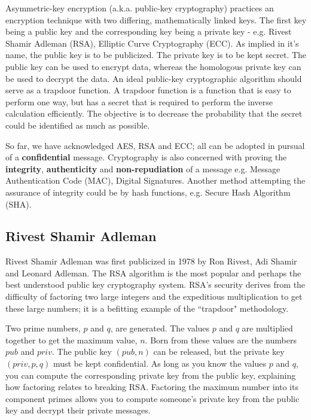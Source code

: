 Asymmetric-key encryption (a.k.a. public-key cryptography) practices an encryption technique with two differing, mathematically linked keys. The first key being a public key and the corresponding key being a private key  - e.g. Rivest Shamir Adleman (RSA), Elliptic Curve Cryptography (ECC). As implied in it's name, the public key is to be publicized. The private key is to be kept secret. The public key can be used to encrypt data, whereas the homologous private key can be used to decrypt the data. An ideal public-key cryptographic algorithm should serve as a trapdoor function. A trapdoor function is a function that is easy to perform one way, but has a secret that is required to perform the inverse calculation efficiently. The objective is to decrease the probability that the secret could be identified as much as possible.

So far, we have acknowledged AES, RSA and ECC; all can be adopted in pursual of a \textbf{confidential} message. Cryptography is also concerned with proving the \textbf{integrity}, \textbf{authenticity} and \textbf{non-repudiation} of a message e.g. Message Authentication Code (MAC), Digital Signatures. Another method attempting the assurance of integrity could be by hash functions, e.g. Secure Hash Algorithm (SHA).

\subsection{Rivest Shamir Adleman}
 Rivest Shamir Adleman was first publicized in 1978 by Ron Rivest, Adi Shamir and Leonard Adleman. The RSA algorithm is the most popular and  perhaps the best understood public key cryptography system. RSA's security derives from the difficulty of factoring two large integers and the expeditious multiplication to get these large numbers; it is a befitting example of the ``trapdoor" methodology. 
 
 Two prime numbers, \(p\) and \(q\), are generated. The values \(p\) and \(q\) are multiplied together to get the maximum value, \(n\). 
 Born from these values are the numbers \(pub\) and \(priv\).
 The public key \((pub,n)\) can be released, but the private key \((priv,p,q)\) must be kept confidential.
 As long as you know the values \(p\) and \(q\), you can compute the corresponding private key from the public key, explaining how factoring relates to breaking RSA. Factoring the maximum number into its component primes allows you to compute someone's private key from the public key and decrypt their private messages.

